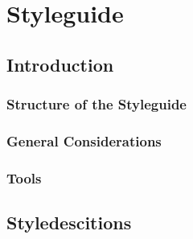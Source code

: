 \chapter{Styleguide}\label{cha:styleguide}\thispagestyle{fancy}
\section{Introduction}
\subsection{Structure of the Styleguide}
\subsection{General Considerations}\label{sec:general_considerations}
\subsection{Tools}\label{sec:tools}
\section{Styledescitions}\label{sec:styledescitions}
